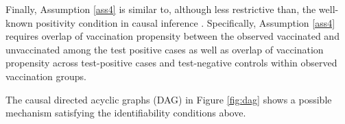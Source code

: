 \documentclass[11pt]{article}
\begin{document}
Finally, Assumption \ref{ass4} is similar to, although less restrictive than, the well-known positivity condition in causal inference \cite{hernan_causal_2020}. Specifically, Assumption \ref{ass4} requires overlap of vaccination propensity between the observed vaccinated and unvaccinated among the test positive cases as well as overlap of vaccination propensity across test-positive cases and test-negative controls within observed vaccination groups. 

The causal directed acyclic graphs (DAG) in Figure \ref{fig:dag} shows a possible mechanism satisfying the identifiability conditions above.


\end{document}
